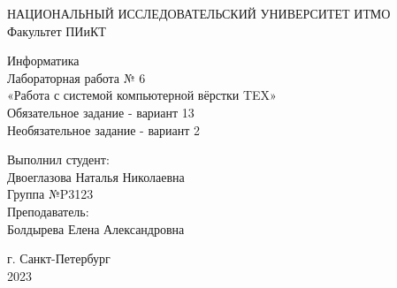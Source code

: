 
\thispagestyle{empty}
\Large

\begin{center}
НАЦИОНАЛЬНЫЙ ИССЛЕДОВАТЕЛЬСКИЙ УНИВЕРСИТЕТ ИТМО\\
Факультет ПИиКТ

\vspace{60mm}

Информатика\\
Лабораторная работа № 6 \\
«Работа с системой компьютерной вёрстки TEX»\\
Обязательное задание - вариант 13\\
Необязательное задание - вариант 2
\end{center}

\vspace{50mm}

\begin{flushright}
Выполнил студент:\\
Двоеглазова Наталья Николаевна\\
Группа №P3123\\
Преподаватель:\\
Болдырева Елена Александровна
\end{flushright}

\vspace{20mm}

\begin{center}
г. Санкт-Петербург\\
2023
\end{center}
